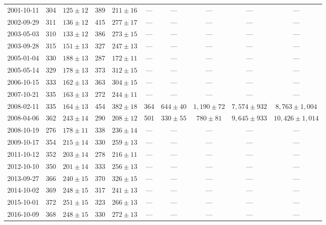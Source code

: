 \begin{landscape}
\begin{longtable}{cccccccccc}
{2001-10-11} & 304 & {$125  \pm  12$} & 389 & {$211 \pm 16$} & --- & --- & --- & --- & --- \\
{2002-09-29} & 311 & {$136  \pm  12$} & 415 & {$277 \pm 17$} & --- & --- & --- & --- & --- \\
{2003-05-03} & 310 & {$133  \pm  12$} & 386 & {$273 \pm 15$} & --- & --- & --- & --- & --- \\
{2003-09-28} & 315 & {$151  \pm  13$} & 327 & {$247 \pm 13$} & --- & --- & --- & --- & --- \\
{2005-01-04} & 330 & {$188  \pm  13$} & 287 & {$172 \pm 11$} & --- & --- & --- & --- & --- \\
{2005-05-14} & 329 & {$178  \pm  13$} & 373 & {$312 \pm 15$} & --- & --- & --- & --- & --- \\
{2006-10-15} & 333 & {$162  \pm  13$} & 363 & {$304 \pm 15$} & --- & --- & --- & --- & --- \\
{2007-10-21} & 335 & {$163  \pm  13$} & 272 & {$244 \pm 11$} & --- & --- & --- & --- & --- \\
{2008-02-11} & 335 & {$164  \pm  13$} & 454 & {$382 \pm 18$} & 364 & {$644 \pm 40$} & {$1,190 \pm 72$} & {$7,574 \pm 932$} & {$8,763 \pm 1,004$} \\
{2008-04-06} & 362 & {$243  \pm  14$} & 290 & {$208 \pm 12$} & 501 & {$330 \pm 55$} & {$780 \pm 81$} & {$9,645 \pm 933$} & {$10,426 \pm 1,014$} \\
{2008-10-19} & 276 & {$178  \pm  11$} & 338 & {$236 \pm 14$} & --- & --- & --- & --- & --- \\
{2009-10-17} & 354 & {$215  \pm  14$} & 330 & {$259 \pm 13$} & --- & --- & --- & --- & --- \\
{2011-10-12} & 352 & {$203  \pm  14$} & 278 & {$216 \pm 11$} & --- & --- & --- & --- & --- \\
{2012-10-10} & 350 & {$201  \pm  14$} & 333 & {$256 \pm 13$} & --- & --- & --- & --- & --- \\
{2013-09-27} & 366 & {$240  \pm  15$} & 370 & {$326 \pm 15$} & --- & --- & --- & --- & --- \\
{2014-10-02} & 369 & {$248  \pm  15$} & 317 & {$241 \pm 13$} & --- & --- & --- & --- & --- \\
{2015-10-01} & 372 & {$251  \pm  15$} & 323 & {$266 \pm 13$} & --- & --- & --- & --- & --- \\
{2016-10-09} & 368 & {$248  \pm  15$} & 330 & {$272 \pm 13$} & --- & --- & --- & --- & --- \\
\end{longtable} 
\end{landscape} 
